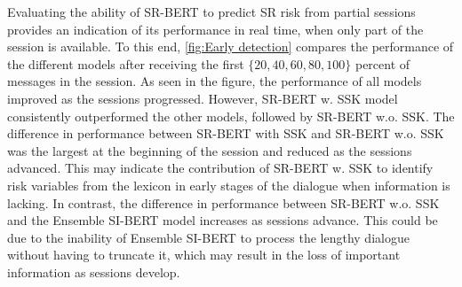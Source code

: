 \documentclass[letterpaper]{article} %
\begin{document}
Evaluating the  ability of SR-BERT to predict SR risk  from  partial sessions provides an indication of  its  performance in real time, when only part of the session is  available.
To this end, \autoref{fig:Early detection} compares the performance of the different models  after receiving the first  $\{20,40,60,80,100\}$ percent of messages in the session.
As seen in the figure, the  performance of all models improved  as the sessions progressed.  However, SR-BERT w. SSK model consistently outperformed the other models, followed by SR-BERT w.o. SSK.
The difference in  performance   between SR-BERT with SSK and SR-BERT w.o. SSK was the largest at the beginning of the session and reduced as the sessions advanced.
This  may indicate the contribution of  SR-BERT w. SSK to identify risk variables from the lexicon in early stages of the dialogue when information is lacking.
In contrast, the  difference in performance  between SR-BERT w.o. SSK and the Ensemble SI-BERT model increases as sessions advance.
This could be due to the inability of Ensemble SI-BERT to  process the lengthy dialogue without having to truncate it, which may result in the loss of important information as sessions develop.
\end{document}
